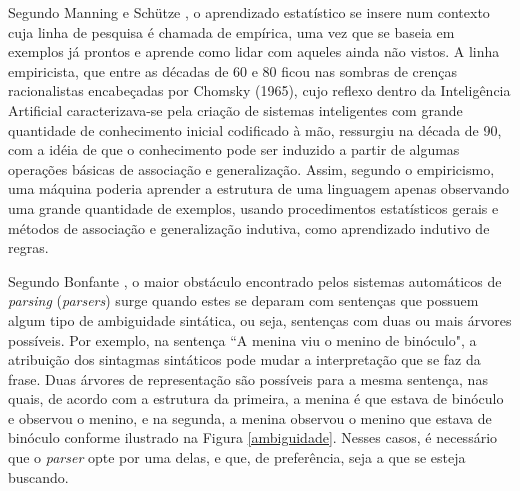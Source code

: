Segundo Manning e Sch{\"u}tze \cite{manning99}, o aprendizado estatístico se insere num contexto cuja linha de pesquisa é chamada de empírica, uma vez que se baseia em exemplos já prontos e aprende como lidar com aqueles ainda não vistos. A linha empiricista, que entre as décadas de 60 e 80 ficou nas sombras de crenças racionalistas encabeçadas por Chomsky (1965), cujo reflexo dentro da Inteligência Artificial caracterizava-se pela criação de sistemas inteligentes com grande quantidade de conhecimento inicial codificado à mão, ressurgiu na década de 90, com a idéia de que o conhecimento pode ser induzido a partir de algumas operações básicas de associação e generalização. Assim, segundo o empiricismo, uma máquina poderia aprender a estrutura de uma linguagem apenas observando uma grande quantidade de exemplos, usando procedimentos estatísticos gerais e métodos de associação e generalização indutiva, como aprendizado indutivo de regras.

Segundo Bonfante \cite{bonfante03}, o maior obstáculo encontrado pelos sistemas automáticos de \emph{parsing} (\emph{parsers}) surge quando estes se deparam com sentenças que possuem algum tipo de ambiguidade sintática, ou seja, sentenças com duas ou mais árvores possíveis. Por exemplo, na sentença ``A menina viu o menino de binóculo", a atribuição dos sintagmas sintáticos pode mudar a interpretação que se faz da frase. Duas árvores de representação são possíveis para a mesma sentença, nas quais, de acordo com a estrutura da primeira, a menina é que estava de binóculo e observou o menino, e na segunda, a menina observou o menino que estava de binóculo conforme ilustrado na Figura \ref{ambiguidade}. Nesses casos, é necessário que o \emph{parser} opte por uma delas, e que, de preferência, seja a que se esteja buscando.

